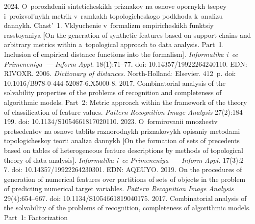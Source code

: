   \begin{multicols}{2}

\renewcommand{\bibname}{\protect\rmfamily References}

{\small\frenchspacing
 {%
 \begin{thebibliography}{9} 
 
 2024. O~porozhdenii sinteticheskikh priznakov na osno\-ve opor\-nykh 
tsepey i~proizvol'nykh metrik v~ram\-kakh topologicheskogo podkhoda k~analizu dannykh. 
Chast'~1. Vklyuchenie v~formalizm empiricheskikh funktsiy rasstoyaniya [On the generation 
of synthetic features based on support chains and arbitrary metrics within a~topological approach 
to data analysis. Part~1. Inclusion of empirical distance functions into the formalism]. 
\textit{Informatika i~ee Primeneniya~--- Inform Appl.} 18(1):71--77. doi: 
10.14357/19922264240110. EDN: RIVOXR.
 2006. \textit{Dictionary of distances}. North-Holland: 
Elsevier. 412~p. doi: 10.1016/B978-0-444-52087-6.X5000-8.
 2017. Combinatorial analysis of the solvability 
properties of the problems of recognition and completeness of algorithmic models. Part~2: 
Metric approach within the framework of the theory of classification of feature values. 
\textit{Pattern Recognition Image Analysis} 27(2):184--199. doi: 10.1134/S1054661817020110.
 2023. O~formirovanii mnozhestv pretsedentov na osnove tablits 
raznorodnykh priznakovykh opisaniy metodami topologicheskoy teorii analiza dannykh [On the 
formation of sets of precedents based on tables of heterogeneous feature descriptions by methods 
of topological theory of data analysis]. \textit{Informatika i~ee Primeneniya~--- Inform Appl.} 
17(3):2--7. doi: 10.14357/19922264230301. EDN: AQEUYO.
 2019. On the procedures of generation of 
numerical features over partitions of sets of objects in the problem of predicting numerical target 
variables. \textit{Pattern Recognition Image Analysis} 29(4):654--667. doi: 
10.1134/S1054661819040175.
 2017. Combinatorial analysis of the solvability of 
the problems of recognition, completeness of algorithmic models. Part~1: Factorization 

\end{thebibliography}}}
\end{multicols}
